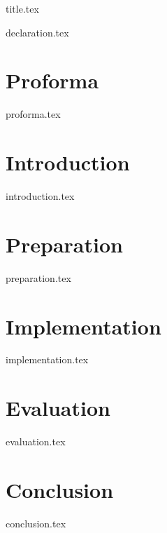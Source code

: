 \documentclass[oneside, a4paper,12pt]{book}
\begin{document}
\frontmatter
{title.tex}



{declaration.tex}

\chapter*{Proforma}
{proforma.tex}



\tableofcontents

\listoffigures
\listoftables


\mainmatter

\chapter{Introduction}\label{chapter:introduction}
{introduction.tex}

\chapter{Preparation}\label{chapter:preparation}
{preparation.tex}

\chapter{Implementation}\label{chapter:implementation}
{implementation.tex}

\chapter{Evaluation}\label{chapter:evaluation}
{evaluation.tex}

\chapter{Conclusion}\label{chapter:conclusion}
{conclusion.tex}


\backmatter


\printbibliography

\appendix
\end{document}
